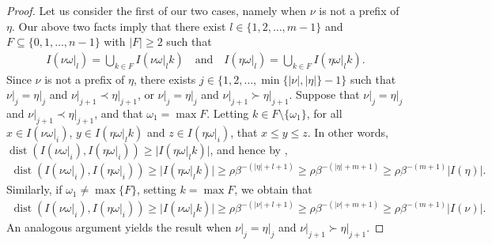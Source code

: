\documentclass[10pt,a4paper]{amsart}
\begin{document}
\begin{proof}
Let us consider the first of our two cases, namely when $\nu$ is not a prefix of $\eta$. Our above two facts imply that there exist $l \in \{1, 2, \ldots, m-1\}$ and $F \subseteq \{0, 1, \ldots, n-1\}$ with $\lvert F \rvert \geq 2$ such that
    \begin{align}\label{eq:HY-splitting_of_cylinders}
        I(\nu \omega\vert_{l}) = \bigcup_{k \in F} I(\nu \omega\vert_{l} k)
        \quad \text{and} \quad
        I(\eta \omega\vert_{l}) = \bigcup_{k \in F} I(\eta \omega\vert_{l} k).
    \end{align}
Since $\nu$ is not a prefix of $\eta$, there exists $j \in \{ 1, 2, \ldots, \min\{\lvert \nu \rvert, \lvert \eta \rvert \} - 1 \}$ such that $\nu\vert_{j} = \eta\vert_{j}$ and $\nu\vert_{j+1} \prec \eta\vert_{j+1}$, or $\nu\vert_{j} = \eta\vert_{j}$ and $\nu\vert_{j+1} \succ \eta\vert_{j+1}$.  Suppose that $\nu\vert_{j} = \eta\vert_{j}$ and $\nu\vert_{j+1} \prec \eta\vert_{j+1}$, and that $\omega_{1} = \max F$. Letting $k \in F \setminus \{\omega_{1}\}$, for all $x \in I(\nu \omega\vert_{i})$, $y \in I(\eta \omega\vert_{l} k)$ and $z \in I(\eta \omega\vert_{i})$, that $x \leq y \leq z$.  In other words, $\operatorname{dist}(I(\nu\omega\vert_{i}), I(\eta\omega\vert_{i})) \geq \lvert I(\eta \omega\vert_{l} k)\rvert$, and hence by ,
    \begin{align*}
        \operatorname{dist}(I(\nu\omega\vert_{i}), I(\eta\omega\vert_{i}))
        \geq \lvert I(\eta \omega\vert_{l} k)\rvert
        \geq \rho \beta^{-(\lvert \eta \rvert + l + 1 )}
        \geq \rho \beta^{-(\lvert \eta \rvert + m + 1)}
        \geq \rho \beta^{-(m + 1)} \lvert I(\eta) \rvert.
    \end{align*}
Similarly, if $\omega_{1} \neq \max\{F\}$, setting $k = \max F$, we obtain that
    \begin{align*}
        \operatorname{dist}(I(\nu\omega\vert_{i}), I(\eta\omega\vert_{i}))
        \geq \lvert I(\nu \omega\vert_{l} k)\rvert
        \geq \rho \beta^{-(\lvert \nu \rvert + l + 1 )}
        \geq \rho \beta^{-(\lvert \nu \rvert + m + 1)}
        \geq \rho \beta^{-(m + 1)} \lvert I(\nu) \rvert.
    \end{align*}
An analogous argument yields the result when $\nu\vert_{j} = \eta\vert_{j}$ and $\nu\vert_{j+1} \succ \eta\vert_{j+1}$.


\end{proof}
\end{document}
